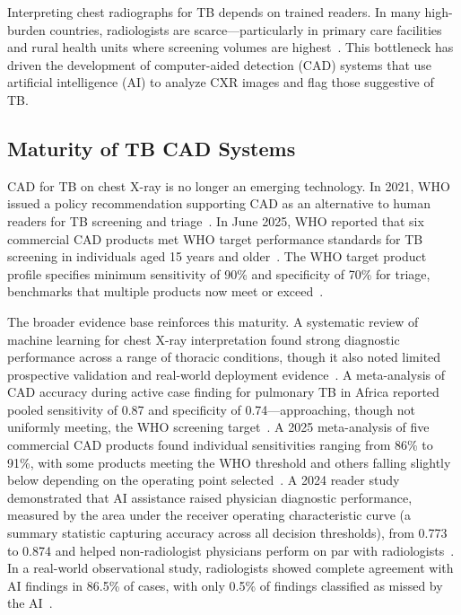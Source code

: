 \documentclass[conference, letterpaper]{IEEEtran}
\begin{document}
Interpreting chest radiographs for TB depends on trained readers. In many high-burden countries, radiologists are scarce---particularly in primary care facilities and rural health units where screening volumes are highest~\cite{who_screening_2021}. This bottleneck has driven the development of computer-aided detection (CAD) systems that use artificial intelligence (AI) to analyze CXR images and flag those suggestive of TB.

\subsection{Maturity of TB CAD Systems}

CAD for TB on chest X-ray is no longer an emerging technology. In 2021, WHO issued a policy recommendation supporting CAD as an alternative to human readers for TB screening and triage~\cite{who_cad_policy_2021}. In June 2025, WHO reported that six commercial CAD products met WHO target performance standards for TB screening in individuals aged 15 years and older~\cite{who_cad_approval_2025}. The WHO target product profile specifies minimum sensitivity of 90\% and specificity of 70\% for triage, benchmarks that multiple products now meet or exceed~\cite{who_tpp_2014}.

The broader evidence base reinforces this maturity. A systematic review of machine learning for chest X-ray interpretation found strong diagnostic performance across a range of thoracic conditions, though it also noted limited prospective validation and real-world deployment evidence~\cite{ahmad2023systematic}. A meta-analysis of CAD accuracy during active case finding for pulmonary TB in Africa reported pooled sensitivity of 0.87 and specificity of 0.74---approaching, though not uniformly meeting, the WHO screening target~\cite{scott2024tb_cad_africa}. A 2025 meta-analysis of five commercial CAD products found individual sensitivities ranging from 86\% to 91\%, with some products meeting the WHO threshold and others falling slightly below depending on the operating point selected~\cite{khan2025tb_meta}. A 2024 reader study demonstrated that AI assistance raised physician diagnostic performance, measured by the area under the receiver operating characteristic curve (a summary statistic capturing accuracy across all decision thresholds), from 0.773 to 0.874 and helped non-radiologist physicians perform on par with radiologists~\cite{anderson2024deep}. In a real-world observational study, radiologists showed complete agreement with AI findings in 86.5\% of cases, with only 0.5\% of findings classified as missed by the AI~\cite{jones2021realworld}.
\end{document}
